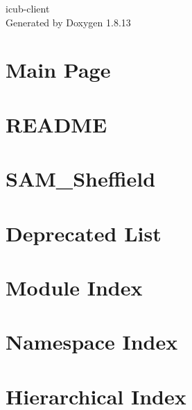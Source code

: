 \documentclass[twoside]{book}
\newcommand{\+}{\discretionary{\mbox{\scriptsize$\hookleftarrow$}}{}{}}
\newcommand{\clearemptydoublepage}{%
  \newpage{\pagestyle{empty}\cleardoublepage}%
}
\begin{document}
\hypersetup{pageanchor=false,
             bookmarksnumbered=true,
             pdfencoding=unicode
            }
\begin{titlepage}
\vspace*{7cm}
\begin{center}%
{\Large icub-\/client }\\
\vspace*{1cm}
{\large Generated by Doxygen 1.8.13}\\
\end{center}
\end{titlepage}
\clearemptydoublepage
{}
\tableofcontents
\clearemptydoublepage
{}
\hypersetup{pageanchor=true}

\chapter{Main Page}
\label{index}\hypertarget{index}{}
\chapter{R\+E\+A\+D\+ME}
\label{md__home_travis_build_robotology_icub-hri_src_modules_reactiveLayer_README}

\chapter{S\+A\+M\+\_\+\+Sheffield}
\label{md__home_travis_build_robotology_icub-hri_src_modules_SAM_README}

\chapter{Deprecated List}
\label{deprecated}

\chapter{Module Index}

\chapter{Namespace Index}

\chapter{Hierarchical Index}

\end{document}
